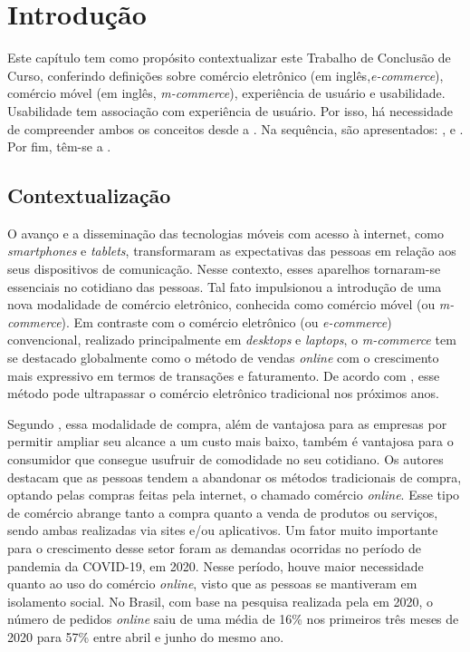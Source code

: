 \chapter{Introdução} 
    \label{chap:Introducao}
    
Este capítulo tem como propósito contextualizar este Trabalho de Conclusão de Curso, conferindo definições sobre comércio eletrônico (em inglês,\textit{e-commerce}), comércio móvel (em inglês, \textit{m-commerce}), experiência de usuário e usabilidade. Usabilidade tem associação com experiência de usuário. Por isso, há necessidade de compreender ambos os conceitos desde a . Na sequência, são apresentados: ,  e . Por fim, têm-se a .



\section{Contextualização} 
    \label{con}
    
O avanço e a disseminação das tecnologias móveis com acesso à internet, como \textit{smartphones} e \textit{tablets}, transformaram as expectativas das pessoas em relação aos seus dispositivos de comunicação. Nesse contexto, esses aparelhos tornaram-se essenciais no cotidiano das pessoas. Tal fato impulsionou a introdução de uma nova modalidade de comércio eletrônico, conhecida como comércio móvel (ou \textit{m-commerce}). Em contraste com o comércio eletrônico (ou \textit{e-commerce}) convencional, realizado principalmente em \textit{desktops} e \textit{laptops}, o \textit{m-commerce} tem se destacado globalmente como o método de vendas \textit{online} com o crescimento mais expressivo em termos de transações e faturamento. De acordo com , esse método pode ultrapassar o comércio eletrônico tradicional nos próximos anos. 

Segundo , essa modalidade de compra, além de vantajosa para as empresas por permitir ampliar seu alcance a um custo mais baixo, também é vantajosa para o consumidor que consegue usufruir de comodidade no seu cotidiano. Os autores destacam que as pessoas tendem a abandonar os métodos tradicionais de compra, optando pelas compras feitas pela internet, o chamado comércio \textit{online}. Esse tipo de comércio abrange tanto a compra quanto a venda de produtos ou serviços, sendo ambas realizadas via sites e/ou aplicativos. Um fator muito importante para o crescimento desse setor foram as demandas ocorridas no período de pandemia da COVID-19, em 2020. Nesse período, houve maior necessidade quanto ao uso do comércio \textit{online}, visto que as pessoas se mantiveram em isolamento social. No Brasil, com base na pesquisa realizada pela  em 2020, o número de pedidos \textit{online} saiu de uma média de 16\% nos primeiros três meses de 2020 para 57\% entre abril e junho do mesmo ano.

